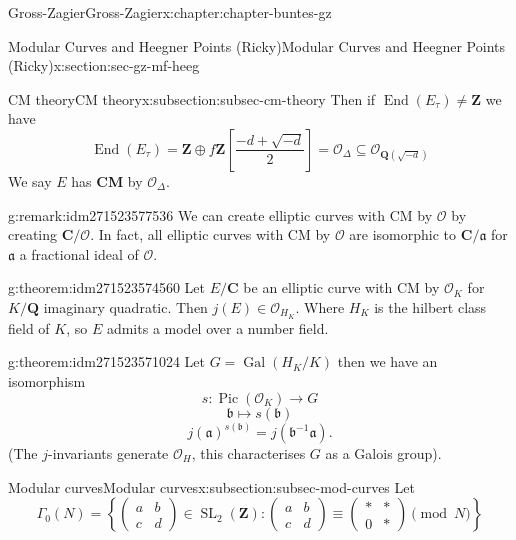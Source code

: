 \documentclass[oneside,10pt,]{book}
\newcommand{\terminology}[1]{\textbf{#1}}
\numberwithin{equation}{section}
\newcommand{\ideal}[1]{\mathfrak{#1}}
\newcommand{\inv}{^{-1}}
\newcommand{\lb}{[}
\newcommand{\rb}{]}
\newcommand{\ZZ}{\mathbf{Z}}
\newcommand{\QQ}{\mathbf{Q}}
\newcommand{\CC}{\mathbf{C}}
\newcommand{\ints}{\mathcal{O}}
\DeclareMathOperator{\End}{End}
\DeclareMathOperator{\Pic}{Pic}
\newcommand{\Gal}[2]{\operatorname{Gal}(#1/#2)}
\DeclareMathOperator{\SL}{SL}
\newcommand{\amp}{&}
\begin{document}
\begin{chapterptx}{Gross-Zagier}{}{Gross-Zagier}{}{}{x:chapter:chapter-buntes-gz}
\begin{sectionptx}{Modular Curves and Heegner Points (Ricky)}{}{Modular Curves and Heegner Points (Ricky)}{}{}{x:section:sec-gz-mf-heeg}
\begin{subsectionptx}{CM theory}{}{CM theory}{}{}{x:subsection:subsec-cm-theory}
Then if \(\End(E_\tau ) \ne \ZZ\) we have%
\begin{equation*}
\End(E_\tau ) = \ZZ \oplus f \ZZ \left\lb \frac {-d + \sqrt{-d}}{2} \right \rb = \ints_\Delta  \subseteq \ints_{\QQ(\sqrt{-d})}
\end{equation*}
We say \(E\) has \terminology{CM} by \(\ints_\Delta \).%
\begin{remark}{}{g:remark:idm271523577536}%
We can create elliptic curves with CM by \(\ints\) by creating \(\CC/\ints\). In fact, all elliptic curves with  CM by \(\ints\) are isomorphic to \(\CC/\ideal a\) for \(\ideal a\) a fractional ideal of \(\ints\).%
\end{remark}
\begin{theorem}{}{}{g:theorem:idm271523574560}%
Let \(E/\CC\) be an elliptic curve with CM by \(\ints_K\) for \(K/\QQ\) imaginary quadratic. Then \(j(E) \in \ints_{H_K}\). Where \(H_K\) is the hilbert class field of \(K\), so \(E\) admits a model over a number field.%
\end{theorem}
\begin{theorem}{}{}{g:theorem:idm271523571024}%
Let \(G = \Gal{H_K}{K}\) then we have an isomorphism%
\begin{equation*}
s\colon  \Pic(\ints_K) \to G
\end{equation*}
%
\begin{equation*}
\ideal b\mapsto s(\ideal b)
\end{equation*}
%
\begin{equation*}
j(\ideal a)^{s(\ideal b)} = j(\ideal b \inv \ideal a)\text{.}
\end{equation*}
(The \(j\)-invariants generate \(\ints_H\), this characterises \(G\) as a Galois group).%
\end{theorem}
\end{subsectionptx}
%
%
\typeout{************************************************}
\typeout{************************************************}
%
\begin{subsectionptx}{Modular curves}{}{Modular curves}{}{}{x:subsection:subsec-mod-curves}
Let%
\begin{equation*}
\Gamma_0 (N) = \left\{\begin{pmatrix} a \amp b \\ c \amp d \end{pmatrix}\in \SL_2(\ZZ) : \begin{pmatrix} a \amp b \\ c \amp d \end{pmatrix} \equiv \begin{pmatrix} \ast \amp \ast \\ 0 \amp \ast \end{pmatrix} \pmod N\right\}

\end{equation*}
\end{subsectionptx}
\end{sectionptx}
\end{chapterptx}
\end{document}
